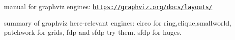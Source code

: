 
\begin{DoxyItemize}
\item manual for graphviz engines\+: \href{https://graphviz.org/docs/layouts/}{\tt https\+://graphviz.\+org/docs/layouts/}
\item summary of graphviz here-\/relevant engines\+: circo for ring,clique,smallworld, patchwork for grids, fdp and sfdp try them. sfdp for huges. 
\end{DoxyItemize}